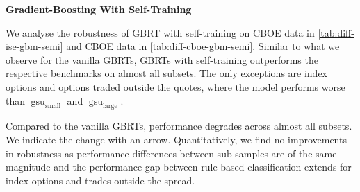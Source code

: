 \clearpage

\textbf{Gradient-Boosting With Self-Training}

We analyse the robustness of \gls{GBRT} with self-training on \gls{CBOE} data in \cref{tab:diff-ise-gbm-semi} and \gls{CBOE} data in \cref{tab:diff-cboe-gbm-semi}. Similar to what we observe for the vanilla \glspl{GBRT}, \glspl{GBRT} with self-training outperforms the respective benchmarks on almost all subsets. The only exceptions are index options and options traded outside the quotes, where the model performs worse than $\operatorname{gsu}_{\mathrm{small}}$ and $\operatorname{gsu}_{\mathrm{large}}$.

Compared to the vanilla \glspl{GBRT}, performance degrades across almost all subsets. We indicate the change with an arrow. Quantitatively, we find no improvements in robustness as performance differences between sub-samples are of the same magnitude and the performance gap between rule-based classification extends for index options and trades outside the spread.

